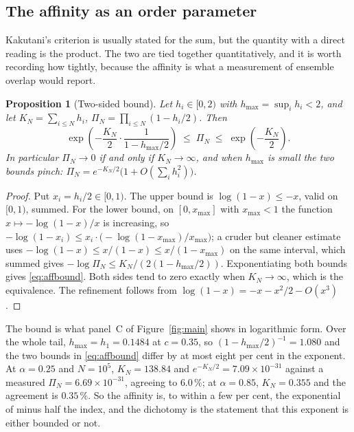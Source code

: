 \documentclass[11pt,reqno]{amsart}
\theoremstyle{plain}
\newtheorem{proposition}[theorem]{Proposition}
\theoremstyle{definition}
\theoremstyle{remark}
\numberwithin{equation}{section}
\begin{document}
\subsection{The affinity as an order parameter}
Kakutani's criterion is usually stated for the sum, but the quantity with a direct reading is the product. The two are tied together quantitatively, and it is worth recording how tightly, because the affinity is what a measurement of ensemble overlap would report.

\begin{proposition}[Two-sided bound]
\label{prop:affinity}
Let $h_i\in[0,2)$ with $h_{\max}=\sup_i h_i<2$, and let $K_N=\sum_{i\le N}h_i$, $\Pi_N=\prod_{i\le N}(1-h_i/2)$. Then
\begin{equation}
\label{eq:affbound}
\exp\!\left(-\frac{K_N}{2}\cdot\frac{1}{1-h_{\max}/2}\right) \;\le\; \Pi_N \;\le\; \exp\!\left(-\frac{K_N}{2}\right).
\end{equation}
In particular $\Pi_N\to0$ if and only if $K_N\to\infty$, and when $h_{\max}$ is small the two bounds pinch: $\Pi_N = e^{-K_N/2}\bigl(1+O(\sum_ih_i^2)\bigr)$.
\end{proposition}

\begin{proof}
Put $x_i=h_i/2\in[0,1)$. The upper bound is $\log(1-x)\le-x$, valid on $[0,1)$, summed. For the lower bound, on $[0,x_{\max}]$ with $x_{\max}<1$ the function $x\mapsto-\log(1-x)/x$ is increasing, so $-\log(1-x_i)\le x_i\cdot\bigl(-\log(1-x_{\max})/x_{\max}\bigr)$; a cruder but cleaner estimate uses $-\log(1-x)\le x/(1-x)\le x/(1-x_{\max})$ on the same interval, which summed gives $-\log\Pi_N\le K_N/(2(1-h_{\max}/2))$. Exponentiating both bounds gives \eqref{eq:affbound}. Both sides tend to zero exactly when $K_N\to\infty$, which is the equivalence. The refinement follows from $\log(1-x)=-x-x^2/2-O(x^3)$.
\end{proof}

The bound is what panel~C of Figure~\ref{fig:main} shows in logarithmic form. Over the whole tail, $h_{\max}=h_1=0.1484$ at $c=0.35$, so $(1-h_{\max}/2)^{-1}=1.080$ and the two bounds in \eqref{eq:affbound} differ by at most eight per cent in the exponent. At $\alpha=0.25$ and $N=10^5$, $K_N=138.84$ and $e^{-K_N/2}=7.09\times10^{-31}$ against a measured $\Pi_N=6.69\times10^{-31}$, agreeing to $6.0\,\%$; at $\alpha=0.85$, $K_N=0.355$ and the agreement is $0.35\,\%$. So the affinity is, to within a few per cent, the exponential of minus half the index, and the dichotomy is the statement that this exponent is either bounded or not.
\end{document}
